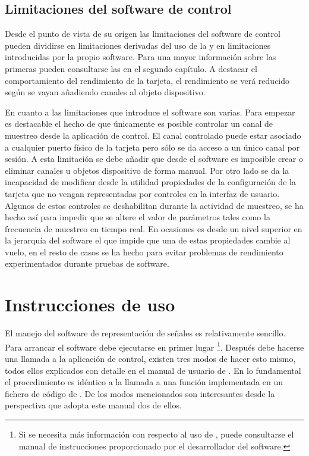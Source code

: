 \subsection{Limitaciones del software de control}

Desde el punto de vista de su origen las limitaciones del software de
control pueden dividirse en limitaciones derivadas del uso de la \kpci{} y
en limitaciones introducidas por la propio software. Para una mayor
información sobre las primeras pueden consultarse las
 en el segundo capítulo. A
destacar el comportamiento del rendimiento de la tarjeta, el rendimiento se
verá reducido según se vayan añadiendo canales al objeto dispositivo.

En cuanto a las limitaciones que introduce el software son varias. Para
empezar es destacable el hecho de que únicamente es posible controlar un
canal de muestreo desde la aplicación de control. El canal controlado puede
estar asociado a cualquier puerto físico de la tarjeta pero sólo se da
acceso a un único canal por sesión. A esta limitación se debe añadir que
desde el software es imposible crear o eliminar canales u objetos
dispositivo de forma manual. Por otro lado se da la incapacidad de
modificar desde la utilidad propiedades de la configuración de la tarjeta
que no vengan representadas por controles en la interfaz de usuario.
Algunos de estos controles se deshabilitan durante la actividad de
muestreo, se ha hecho así para impedir que se altere el valor de parámetros
tales como la frecuencia de muestreo en tiempo real. En ocasiones es
\matlab{} desde un nivel superior en la jerarquía del software el que
impide que una de estas propiedades cambie al vuelo, en el resto de casos
se ha hecho para evitar problemas de rendimiento experimentados durante
pruebas de software.


\section{Instrucciones de uso}

El manejo del software de representación de señales es relativamente
sencillo. Para arrancar el software debe ejecutarse en primer lugar
\matlab{}\footnote{Si se necesita más información con respecto al uso de
\matlab{}, puede consultarse el manual de instrucciones proporcionado por
el desarrollador del software.}. Después debe hacerse una llamada a la
aplicación de control, existen tres modos de hacer esto mismo, todos ellos
explicados con detalle en el manual de usuario de \matlab{}. En lo
fundamental el procedimiento es idéntico a la llamada a una función
implementada en un fichero de código de \matlab{}. De los modos mencionados
son interesantes desde la perspectiva que adopta este manual dos de
ellos.

